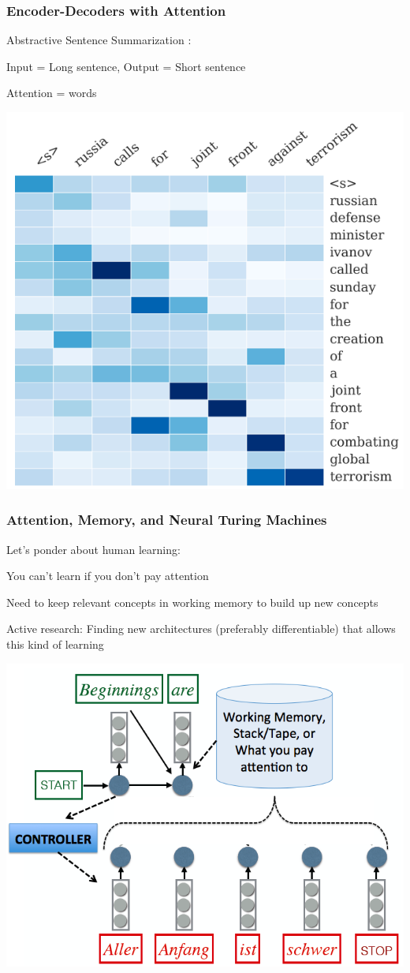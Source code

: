 \begin{frame}
\frametitle{Encoder-Decoders with Attention}
Abstractive Sentence Summarization \cite{rush15abstractive}:
\bi
\item Input = Long sentence, Output = Short sentence
\item Attention = words
\ei
\centerline{\includegraphics[scale=0.33]{figs/rush15_example}}
\end{frame}

\begin{frame}
\frametitle{Attention, Memory, and Neural Turing Machines}
\bi
\pause
\item Let's ponder about human learning: \pause
\bi
	\item You can't learn if you don't pay attention \pause
	\item Need to keep relevant concepts in working memory to build up new concepts \pause
\ei
\item Active research: Finding new architectures (preferably differentiable) that allows this kind of learning \cite{graves14turing,weston14memory}
\ei 
\centerline{\includegraphics[scale=0.27]{figs/attention_memory_stack}}
\end{frame}


